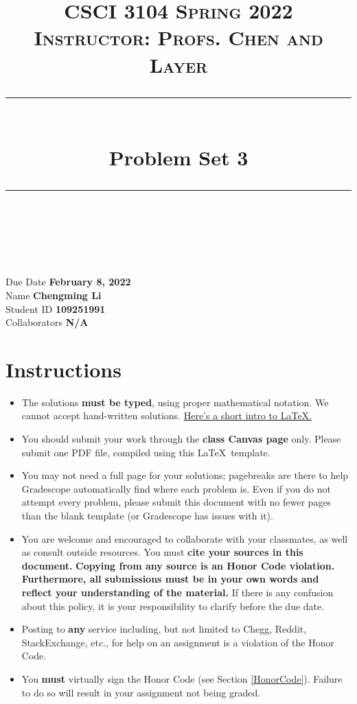 \documentclass[11pt]{article}
\title{
\normalfont \normalsize 
\textsc{CSCI 3104 Spring 2022 \\ 
Instructor: Profs. Chen and Layer} \\
[10pt] 
\rule{\linewidth}{0.5pt} \\[6pt] 
\huge Problem Set 3 \\
\rule{\linewidth}{2pt}  \\[10pt]
}
\date{}
\theoremstyle{definition}
\theoremstyle{definition}
\theoremstyle{definition}
\begin{document}

\maketitle


\noindent
Due Date \dotfill \textbf{February 8, 2022} \\
Name \dotfill \textbf{Chengming Li} \\
Student ID \dotfill \textbf{109251991} \\
Collaborators \dotfill \textbf{N/A}

\tableofcontents

\section{Instructions}
 \begin{itemize}
	\item The solutions \textbf{must be typed}, using proper mathematical notation. We cannot accept hand-written solutions. \href{http://ece.uprm.edu/~caceros/latex/introduction.pdf}{Here's a short intro to \LaTeX.}
	\item You should submit your work through the \textbf{class Canvas page} only. Please submit one PDF file, compiled using this \LaTeX \ template.
	\item You may not need a full page for your solutions; pagebreaks are there to help Gradescope automatically find where each problem is. Even if you do not attempt every problem, please submit this document with no fewer pages than the blank template (or Gradescope has issues with it).

	\item You are welcome and encouraged to collaborate with your classmates, as well as consult outside resources. You must \textbf{cite your sources in this document.} \textbf{Copying from any source is an Honor Code violation. Furthermore, all submissions must be in your own words and reflect your understanding of the material.} If there is any confusion about this policy, it is your responsibility to clarify before the due date. 

	\item Posting to \textbf{any} service including, but not limited to Chegg, Reddit, StackExchange, etc., for help on an assignment is a violation of the Honor Code.

	\item You \textbf{must} virtually sign the Honor Code (see Section \ref{HonorCode}). Failure to do so will result in your assignment not being graded.
\end{itemize}
\end{document}
